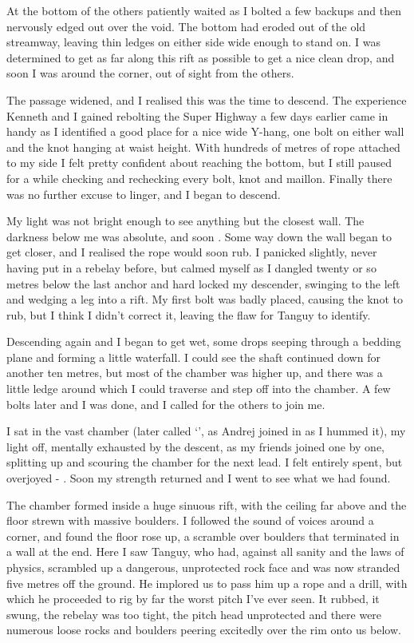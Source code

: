 At the bottom of  the others patiently waited as I bolted a few backups and then nervously edged out over the void. The bottom had eroded out of the old streamway, leaving thin ledges on either side wide enough to stand on. I was determined to get as far along this rift as possible to get a nice clean drop, and soon I was around the corner, out of sight from the others.  
 
The passage widened, and I realised this was the time to descend. The experience Kenneth and I gained rebolting the Super Highway a few days earlier came in handy as I identified a good place for a nice wide Y-hang, one bolt on either wall and the knot hanging at waist height. With hundreds of metres of rope attached to my side I felt pretty confident about reaching the bottom, but I still paused for a while checking and rechecking every bolt, knot and maillon. Finally there was no further excuse to linger, and I began to descend.
 
My light was not bright enough to see anything but the closest wall. The darkness below me was absolute, and soon . Some way down the wall began to get closer, and I realised the rope would soon rub. I panicked slightly, never having put in a rebelay before, but calmed myself as I dangled twenty or so metres below the last anchor and hard locked my descender, swinging to the left and wedging a leg into a rift. My first bolt was badly placed, causing the knot to rub, but I think I didn't correct it, leaving the flaw for Tanguy to identify. 
 
Descending again and I began to get wet, some drops seeping through a bedding plane and forming a little waterfall. I could see the shaft continued down for another ten metres, but most of the chamber was higher up, and there was a little ledge around which I could traverse and step off into the chamber. A few bolts later and I was done, and I called for the others to join me.
 
I sat in the vast chamber (later called `', as Andrej joined in as I hummed it), my light off, mentally exhausted by the descent, as my friends joined one by one, splitting up and scouring the chamber for the next lead. I felt entirely spent, but overjoyed - . Soon my strength returned and I went to see what we had found.
 
The chamber formed inside a huge sinuous rift, with the ceiling far above and the floor strewn with massive boulders. I followed the sound of voices around a corner, and found the floor rose up, a scramble over boulders that terminated in a wall at the end. Here I saw Tanguy, who had, against all sanity and the laws of physics, scrambled up a dangerous, unprotected rock face and was now stranded five metres off the ground. He implored us to pass him up a rope and a drill, with which he proceeded to rig by far the worst pitch I've ever seen. It rubbed, it swung, the rebelay was too tight, the pitch head unprotected and there were numerous loose rocks and boulders peering excitedly over the rim onto us below.

